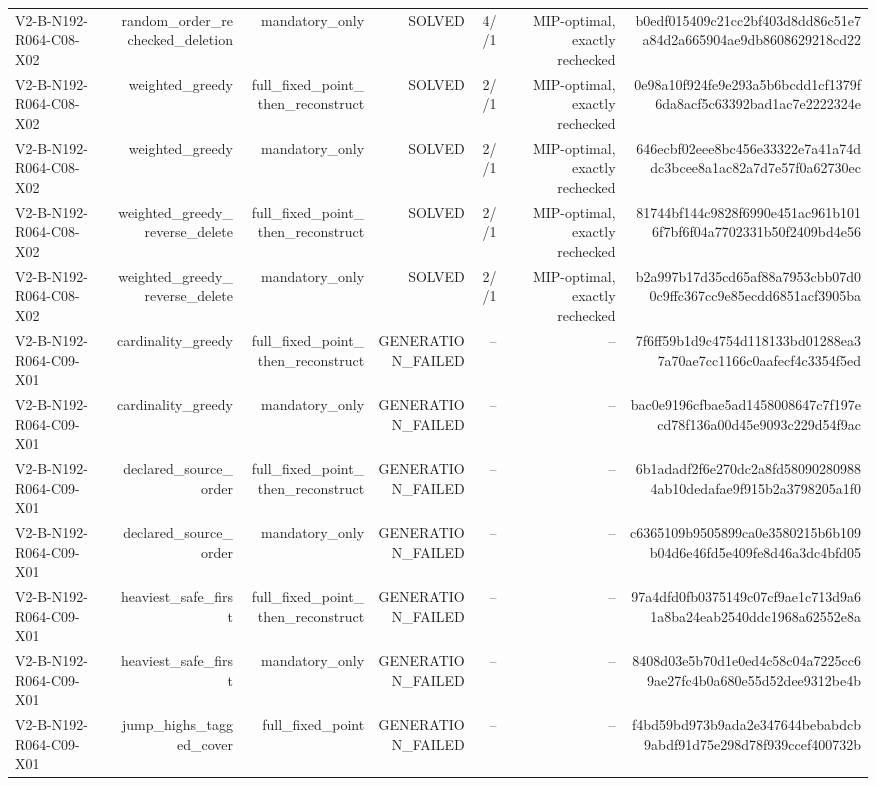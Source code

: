 {\begin{longtable}{lrrrrrr}
V2-B-N192-R064-C08-X02 & random\_order\_rechecked\_deletion & mandatory\_only & SOLVED & 4//1 & MIP-optimal, exactly rechecked & b0edf015409c21cc2bf403d8dd86c51e7a84d2a665904ae9db8608629218cd22 \\
V2-B-N192-R064-C08-X02 & weighted\_greedy & full\_fixed\_point\_then\_reconstruct & SOLVED & 2//1 & MIP-optimal, exactly rechecked & 0e98a10f924fe9e293a5b6bcdd1cf1379f6da8acf5c63392bad1ac7e2222324e \\
V2-B-N192-R064-C08-X02 & weighted\_greedy & mandatory\_only & SOLVED & 2//1 & MIP-optimal, exactly rechecked & 646ecbf02eee8bc456e33322e7a41a74ddc3bcee8a1ac82a7d7e57f0a62730ec \\
V2-B-N192-R064-C08-X02 & weighted\_greedy\_reverse\_delete & full\_fixed\_point\_then\_reconstruct & SOLVED & 2//1 & MIP-optimal, exactly rechecked & 81744bf144c9828f6990e451ac961b1016f7bf6f04a7702331b50f2409bd4e56 \\
V2-B-N192-R064-C08-X02 & weighted\_greedy\_reverse\_delete & mandatory\_only & SOLVED & 2//1 & MIP-optimal, exactly rechecked & b2a997b17d35cd65af88a7953cbb07d00c9ffc367cc9e85ecdd6851acf3905ba \\
V2-B-N192-R064-C09-X01 & cardinality\_greedy & full\_fixed\_point\_then\_reconstruct & GENERATION\_FAILED & -- & -- & 7f6ff59b1d9c4754d118133bd01288ea37a70ae7cc1166c0aafecf4c3354f5ed \\
V2-B-N192-R064-C09-X01 & cardinality\_greedy & mandatory\_only & GENERATION\_FAILED & -- & -- & bac0e9196cfbae5ad1458008647c7f197ecd78f136a00d45e9093c229d54f9ac \\
V2-B-N192-R064-C09-X01 & declared\_source\_order & full\_fixed\_point\_then\_reconstruct & GENERATION\_FAILED & -- & -- & 6b1adadf2f6e270dc2a8fd580902809884ab10dedafae9f915b2a3798205a1f0 \\
V2-B-N192-R064-C09-X01 & declared\_source\_order & mandatory\_only & GENERATION\_FAILED & -- & -- & c6365109b9505899ca0e3580215b6b109b04d6e46fd5e409fe8d46a3dc4bfd05 \\
V2-B-N192-R064-C09-X01 & heaviest\_safe\_first & full\_fixed\_point\_then\_reconstruct & GENERATION\_FAILED & -- & -- & 97a4dfd0fb0375149c07cf9ae1c713d9a61a8ba24eab2540ddc1968a62552e8a \\
V2-B-N192-R064-C09-X01 & heaviest\_safe\_first & mandatory\_only & GENERATION\_FAILED & -- & -- & 8408d03e5b70d1e0ed4c58c04a7225cc69ae27fc4b0a680e55d52dee9312be4b \\
V2-B-N192-R064-C09-X01 & jump\_highs\_tagged\_cover & full\_fixed\_point & GENERATION\_FAILED & -- & -- & f4bd59bd973b9ada2e347644bebabdcb9abdf91d75e298d78f939ccef400732b \\

\end{longtable}}
